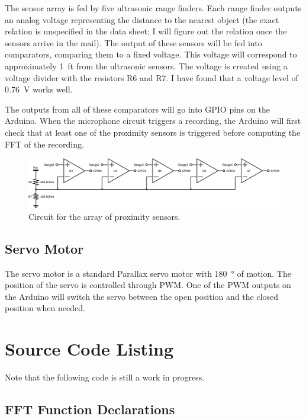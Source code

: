 \documentclass[10pt]{article}           %
\begin{document}
The sensor array is fed by five ultrasonic range finders. Each range finder
outputs an analog voltage representing the distance to the nearest object (the
exact relation is unspecified in the data sheet; I will figure out the relation
once the sensors arrive in the mail). The output of these sensors will be fed
into comparators, comparing them to a fixed voltage. This voltage will
correspond to approximately \SI{1}{ft} from the ultrasonic sensors. The voltage
is created using a voltage divider with the resistors R6 and R7. I have found
that a voltage level of \SI{0.76}{\volt} works well.

The outputs from all of these comparators will go into GPIO pins on the Arduino.
When the microphone circuit triggers a recording, the Arduino will first check
that at least one of the proximity sensors is triggered before computing the
FFT of the recording.

\begin{figure}[h]
    \centering
    \includegraphics[width=1.0\linewidth]{sch/rangefinders.png}
    \caption{Circuit for the array of proximity sensors.}
\label{fig:rangefinders}
\end{figure}

\subsection{Servo Motor}
\label{sub:servo_motor}

The servo motor is a standard Parallax servo motor with \SI{180}{\degree} of
motion. The position of the servo is controlled through PWM\@. One of the PWM
outputs on the Arduino will switch the servo between the open position and the
closed position when needed.

\section{Source Code Listing}
\label{sec:source_code_listing}

Note that the following code is still a work in progress.

\subsection{FFT Function Declarations}
\label{sub:fft_function_declarations}
\end{document}
